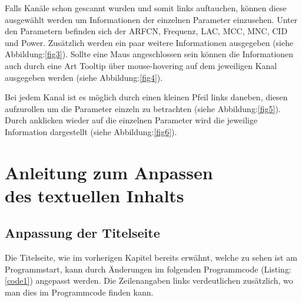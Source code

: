 \noindent Falls Kanäle schon gescannt wurden und somit links auftauchen, können diese ausgewählt werden um Informationen der einzelnen Parameter einzusehen.
Unter den Parametern befinden sich der ARFCN, Frequenz, LAC, MCC, MNC, CID und Power.
Zusätzlich werden ein paar weitere Informationen ausgegeben (siehe Abbildung:\ref{fig3}).
Sollte eine Maus angeschlossen sein können die Informationen auch durch eine Art Tooltip über mouse-hovering auf dem jeweiligen Kanal ausgegeben werden (siehe Abbildung:\ref{fig4}).




\newpage Bei jedem Kanal ist es möglich durch einen kleinen Pfeil links daneben, diesen aufzurollen um die Parameter einzeln zu betrachten (siehe Abbildung:\ref{fig5}). Durch anklicken wieder auf die einzelnen Parameter wird die jeweilige Information dargestellt (siehe Abbildung:\ref{fig6}).




\newpage
\section[Anleitung zum Anpassen des textuellen Inhalts]{Anleitung zum Anpassen \\ des textuellen Inhalts}

%
%

\subsection*{Anpassung der Titelseite}

%
%
Die Titelseite, wie im vorherigen Kapitel bereits erwähnt, welche zu sehen ist am Programmstart, kann durch Änderungen im folgenden Programmcode (Listing: \ref{code1}) angepasst werden.
Die Zeilenangaben links verdeutlichen zusätzlich, wo man dies im Programmcode finden kann.

